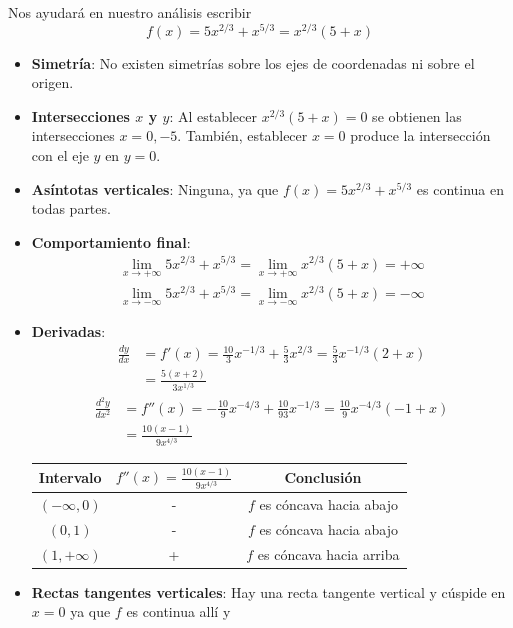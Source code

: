 \documentclass[12pt]{article}
\begin{document}
Nos ayudará en nuestro análisis escribir
\[f(x)=5x^{2/3}+x^{5/3}=x^{2/3}(5+x)\]
\begin{itemize}
\item \textbf{Simetría}: No existen simetrías sobre los ejes de coordenadas ni sobre el origen.
\item \textbf{Intersecciones $x$ y $y$}: Al establecer $x^{2/3}(5+x)=0$ se obtienen las intersecciones $x=0,-5$. También, establecer $x=0$ produce la intersección con el eje $y$ en $y=0$.
\item  \textbf{Asíntotas verticales}: Ninguna, ya que $f(x) = 5x^{2/3}+x^{5/3}$ es continua en todas partes.
\item  \textbf{Comportamiento final}: 
  \begin{align*}
    \lim_{x \to +\infty}5x^{2/3}+x^{5/3} = \lim_{x \to +\infty} x^{2/3}(5+x) = +\infty \\
    \lim_{x \to -\infty} 5x^{2/3}+x^{5/3} = \lim_{x \to -\infty}  x^{2/3}(5+x) = -\infty 
  \end{align*}
\item \textbf{Derivadas}:
  \begin{align*}
    \frac{dy}{dx}
    &= f'(x) = \frac{10}{3}x^{-1/3} + \frac{5}{3}x^{2/3} = \frac{5}{3}x^{-1/3}(2+x)\\
    &= \frac{5(x+2)}{3x^{1/3}} 
  \end{align*}
  \begin{align*}
    \frac{d^2y}{dx^2}
    &= f''(x) = -\frac{10}{9}x^{-4/3} + \frac{10}{93}x^{-1/3} = \frac{10}{9}x^{-4/3}(-1+x) \\
    &= \frac{10(x-1)}{9x^{4/3}}
  \end{align*}
    \begin{table}[H]
    \centering
    \begin{tabular}{c|c|c}
      \hline
      Intervalo & $f''(x) = \frac{10(x-1)}{9x^{4/3}}$ & Conclusión \\
      \hline
      $(-\infty,0)$ & - & $f$ es cóncava hacia abajo \\
      $(0,1)$ & - & $f$ es cóncava hacia abajo \\
      $(1,+\infty)$ & + & $f$ es cóncava hacia arriba \\
      \hline
    \end{tabular}
  \end{table}
\item \textbf{Rectas tangentes verticales}: Hay una recta tangente vertical y cúspide en $x = 0$ ya que $f$ es continua allí y
  \begin{align*}

\end{align*}
\end{itemize}
\end{document}
